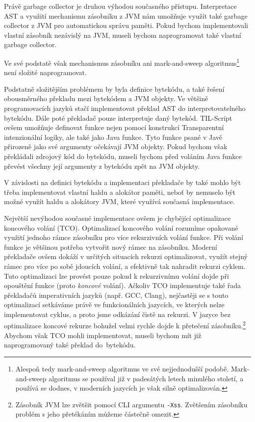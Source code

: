 Právě garbage collector je druhou výhodou současného přístupu. Interpretace AST a využití mechanismu
zásobníku z JVM nám umožňuje využít také garbage collector z JVM pro automatickou správu paměti.
Pokud bychom implementovali vlastní zásobník nezávislý na JVM, museli bychom naprogramovat také
vlastní garbage collector.

Ve své podstatě však mechanismus zásobníku ani mark-and-sweep algoritmus\footnote{Alespoň tedy
  mark-and-sweep algoritmus ve své nejjednodušší podobě. Mark-and-sweep algoritmus se používal již
  v padesátých letech minulého století\cite{lisp-src}, a používá se dodnes, v moderních jazycích je
  však silně optimalizován.} není složité naprogramovat.

Podstatně složitějším problémem by byla definice bytekódu, a také řešení obousměrného překladu mezi
bytekódem a JVM objekty. Ve většině programovacích jazyků stačí implementovat překlad AST
do interpretovatelného bytekódu. Dále poté překladač pouze interpretuje daný bytekód. TIL-Script
ovšem umožňuje definovat funkce nejen pomocí konstrukcí Transparentní intenzionální logiky, ale také
jako Java funkce. Tyto funkce psané v Javě přirozeně jako své argumenty očekávají JVM objekty.
Pokud bychom však překládali zdrojový kód do bytekódu, museli bychom před voláním Java funkce
převést všechny její argumenty z bytekódu zpět na JVM objekty.

V závislosti na definici bytekódu a implementaci překladače by také mohlo být třeba implementovat
vlastní haldu a alokátor paměti, neboť by nemuselo být možné využít haldu a alokátory JVM, které
využívá současná implementace.

Největší nevýhodou současné implementace ovšem je chybějící optimalizace koncového volání
(TCO)\cite{sicp-src}.
Optimalizací koncového volání rozumíme opakované využití jednoho rámce zásobníku pro více
rekurzivních volání funkce. Při volání funkce je většinou potřeba vytvořit nový rámec na zásobníku.
Moderní překladače ovšem dokáží v určitých situacích rekurzi optimalizovat, využít stejný rámec
pro více po sobě jdoucích volání, a efektivně tak nahradit rekurzi cyklem. Tuto optimalizaci lze
provést pouze pokud k rekurzivnímu volání dojde při opouštění funkce (proto \textit{koncové}
volání). Ačkoliv TCO implementuje také řada překladačů imperativních jazyků (např. GCC, Clang),
nejčastěji se s touto optimalizací setkáváme právě ve funkcionálních jazycích, ve kterých nelze
implementovat cyklus, a proto jsme odkázání čistě na rekurzi. V jazyce bez optimalizace koncové
rekurze bohužel velmi rychle dojde k přetečení zásobníku.\footnote{
  Zásobník JVM lze zvětšit pomocí CLI argumentu \lstinline{-Xss}. Zvětšením zásobníku problém s jeho
  přetékáním můžeme částečně omezit.
} Abychom však TCO mohli implementovat, museli bychom mít již naprogramovaný také překlad
do~bytekódu.

